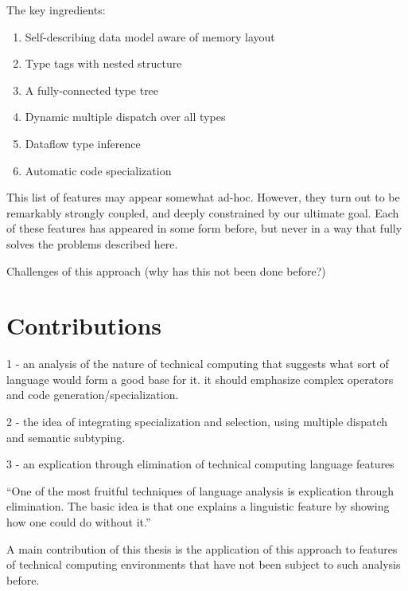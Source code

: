 The key ingredients:

\begin{singlespace}
\begin{enumerate}
\item Self-describing data model aware of memory layout
\item Type tags with nested structure
\item A fully-connected type tree
\item Dynamic multiple dispatch over all types %
\item Dataflow type inference
\item Automatic code specialization
\end{enumerate}
\end{singlespace}

This list of features may appear somewhat ad-hoc. However, they turn out to be
remarkably strongly coupled, and deeply constrained by our ultimate goal.
Each of these features has appeared in some form before, but never in a way
that fully solves the problems described here.

Challenges of this approach (why has this not been done before?)


\section{Contributions}

1 - an analysis of the nature of technical computing that suggests what
sort of language would form a good base for it. it should emphasize
complex operators and code generation/specialization.

2 - the idea of integrating specialization and selection, using multiple dispatch
and semantic subtyping.

3 - an explication through elimination of technical computing language features

``One of the most fruitful techniques of language analysis is explication through
elimination. The basic idea is that one explains a linguistic feature by showing
how one could do without it.'' \cite{morris}

A main contribution of this thesis is the application of this approach to features
of technical computing environments that have not been subject to such analysis
before.

